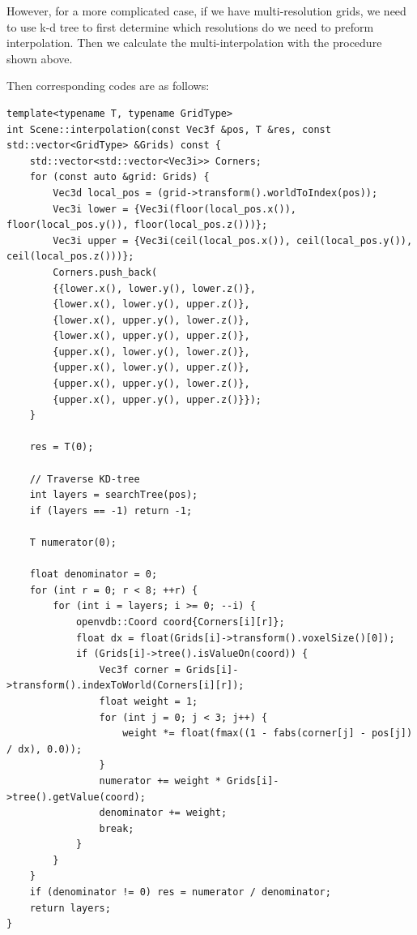 \documentclass[acmtog]{acmart}
\begin{document}
    However, for a more complicated case, if we have multi-resolution grids, we need to use k-d tree to first determine which resolutions do we need to preform interpolation.
    Then we calculate the multi-interpolation with the procedure shown above.

    Then corresponding codes are as follows:
    \begin{lstlisting}[label={lst:lstlisting6}]
template<typename T, typename GridType>
int Scene::interpolation(const Vec3f &pos, T &res, const std::vector<GridType> &Grids) const {
    std::vector<std::vector<Vec3i>> Corners;
    for (const auto &grid: Grids) {
        Vec3d local_pos = (grid->transform().worldToIndex(pos));
        Vec3i lower = {Vec3i(floor(local_pos.x()), floor(local_pos.y()), floor(local_pos.z()))};
        Vec3i upper = {Vec3i(ceil(local_pos.x()), ceil(local_pos.y()), ceil(local_pos.z()))};
        Corners.push_back(
        {{lower.x(), lower.y(), lower.z()},
        {lower.x(), lower.y(), upper.z()},
        {lower.x(), upper.y(), lower.z()},
        {lower.x(), upper.y(), upper.z()},
        {upper.x(), lower.y(), lower.z()},
        {upper.x(), lower.y(), upper.z()},
        {upper.x(), upper.y(), lower.z()},
        {upper.x(), upper.y(), upper.z()}});
    }

    res = T(0);

    // Traverse KD-tree
    int layers = searchTree(pos);
    if (layers == -1) return -1;

    T numerator(0);

    float denominator = 0;
    for (int r = 0; r < 8; ++r) {
        for (int i = layers; i >= 0; --i) {
            openvdb::Coord coord{Corners[i][r]};
            float dx = float(Grids[i]->transform().voxelSize()[0]);
            if (Grids[i]->tree().isValueOn(coord)) {
                Vec3f corner = Grids[i]->transform().indexToWorld(Corners[i][r]);
                float weight = 1;
                for (int j = 0; j < 3; j++) {
                    weight *= float(fmax((1 - fabs(corner[j] - pos[j]) / dx), 0.0));
                }
                numerator += weight * Grids[i]->tree().getValue(coord);
                denominator += weight;
                break;
            }
        }
    }
    if (denominator != 0) res = numerator / denominator;
    return layers;
}
    \end{lstlisting}
\end{document}
